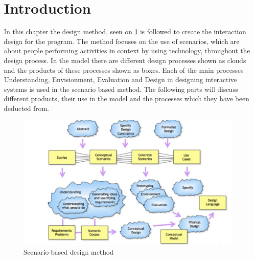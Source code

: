 \section{Introduction}
In this chapter the design method, seen on \cref{scenarioModel} is followed to create the interaction design for the program. The method focuses on the use of scenarios, which are about people performing activities in context by using technology, throughout the design process. In the model there are different design processes shown as clouds and the products of these processes shown as boxes. Each of the main processes Understanding, Envisionment, Evaluation and Design in designing interactive systems is used in the scenario based method. The following parts will discuss different products, their use in the model and the processes which they have been deducted from.

\begin{figure}[H]
	\centering
	\includegraphics[width=1\textwidth]{Grafik/scenarioModel}
	\caption{Scenario-based design method}
	\label{scenarioModel}
\end{figure}